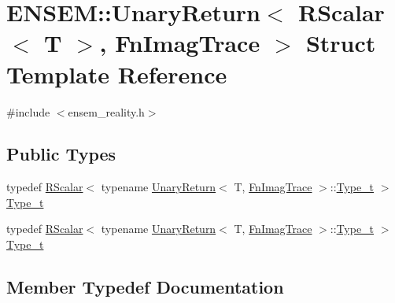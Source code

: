 \hypertarget{structENSEM_1_1UnaryReturn_3_01RScalar_3_01T_01_4_00_01FnImagTrace_01_4}{}\section{E\+N\+S\+EM\+:\+:Unary\+Return$<$ R\+Scalar$<$ T $>$, Fn\+Imag\+Trace $>$ Struct Template Reference}
\label{structENSEM_1_1UnaryReturn_3_01RScalar_3_01T_01_4_00_01FnImagTrace_01_4}


{\ttfamily \#include $<$ensem\+\_\+reality.\+h$>$}

\subsection*{Public Types}
\begin{DoxyCompactItemize}
\item 
typedef \mbox{\hyperlink{classENSEM_1_1RScalar}{R\+Scalar}}$<$ typename \mbox{\hyperlink{structENSEM_1_1UnaryReturn}{Unary\+Return}}$<$ T, \mbox{\hyperlink{structENSEM_1_1FnImagTrace}{Fn\+Imag\+Trace}} $>$\+::\mbox{\hyperlink{structENSEM_1_1UnaryReturn_3_01RScalar_3_01T_01_4_00_01FnImagTrace_01_4_ade2d3556f547d545e7db88cb51393a3d}{Type\+\_\+t}} $>$ \mbox{\hyperlink{structENSEM_1_1UnaryReturn_3_01RScalar_3_01T_01_4_00_01FnImagTrace_01_4_ade2d3556f547d545e7db88cb51393a3d}{Type\+\_\+t}}
\item 
typedef \mbox{\hyperlink{classENSEM_1_1RScalar}{R\+Scalar}}$<$ typename \mbox{\hyperlink{structENSEM_1_1UnaryReturn}{Unary\+Return}}$<$ T, \mbox{\hyperlink{structENSEM_1_1FnImagTrace}{Fn\+Imag\+Trace}} $>$\+::\mbox{\hyperlink{structENSEM_1_1UnaryReturn_3_01RScalar_3_01T_01_4_00_01FnImagTrace_01_4_ade2d3556f547d545e7db88cb51393a3d}{Type\+\_\+t}} $>$ \mbox{\hyperlink{structENSEM_1_1UnaryReturn_3_01RScalar_3_01T_01_4_00_01FnImagTrace_01_4_ade2d3556f547d545e7db88cb51393a3d}{Type\+\_\+t}}
\end{DoxyCompactItemize}


\subsection{Member Typedef Documentation}
\mbox{\label{structENSEM_1_1UnaryReturn_3_01RScalar_3_01T_01_4_00_01FnImagTrace_01_4_ade2d3556f547d545e7db88cb51393a3d}} 
